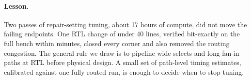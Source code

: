 \paragraph{Lesson.}
Two passes of repair-setting tuning, about 17 hours of compute, did not move the failing endpoints. One RTL change of under 40 lines, verified bit-exactly on the full bench within minutes, closed every corner and also removed the routing congestion. The general rule we draw is to pipeline wide selects and long fan-in paths at RTL before physical design. A small set of path-level timing estimates, calibrated against one fully routed run, is enough to decide when to stop tuning.
